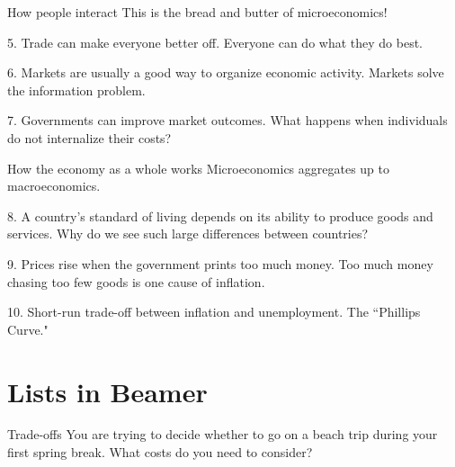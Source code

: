 \documentclass[aspectratio=169]{beamer}
\begin{document}
\begin{frame}{How people interact}
    This is the bread and butter of microeconomics!
    
    \medskip

    \begin{block}{5. Trade can make everyone better off.}
        Everyone can do what they do best.
    \end{block}

    \begin{block}{6. Markets are usually a good way to organize economic activity.}
        Markets solve the information problem.
    \end{block}

    \begin{block}{7. Governments can improve market outcomes.}
        What happens when individuals do not internalize their costs?
    \end{block}
\end{frame} 

\begin{frame}{How the economy as a whole works}
    Microeconomics aggregates up to macroeconomics.

    \medskip

    \begin{block}{8. A country's standard of living depends on its ability to produce goods and services.}
        Why do we see such large differences between countries?
    \end{block}

    \begin{block}{9. Prices rise when the government prints too much money.}
        Too much money chasing too few goods is one cause of inflation.
    \end{block}

    \begin{block}{10. Short-run trade-off between inflation and unemployment.}
        The ``Phillips Curve."
    \end{block}
    \section{Lists in Beamer}
\end{frame} 

\begin{frame}{Trade-offs}
    You are trying to decide whether to go on a beach trip during your first spring break. What costs do you need to consider? 
\end{frame}
\end{document}
